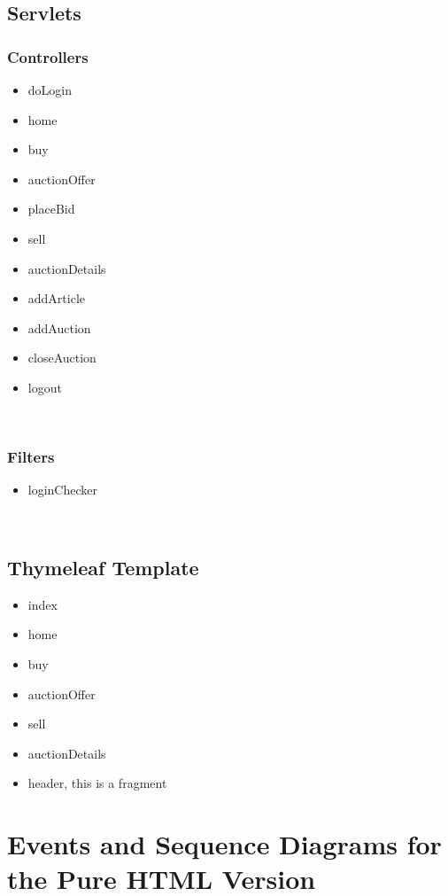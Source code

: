 \documentclass[12pt, a4paper, renqo, final]{amsart}
\let\stdsection\section
\renewcommand{\section}{\newpage\stdsection}
\begin{document}
		\subsection{Servlets}
			\subsubsection{Controllers}
				\begin{itemize}
					\item doLogin
					\item home
					\item buy
					\item auctionOffer
					\item placeBid
					\item sell
					\item auctionDetails
					\item addArticle
					\item addAuction
					\item closeAuction
					\item logout
				\end{itemize}
				\phantom{.}\\
			\subsubsection{Filters}
				\begin{itemize}
					\item loginChecker
				\end{itemize}
				\phantom{.}\\
			\subsection{Thymeleaf Template}
				\begin{itemize}
					\item index
					\item home
					\item buy
					\item auctionOffer
					\item sell
					\item auctionDetails
					\item header, this is a fragment
				\end{itemize}
		\section[PureHTML - Events and Sequence Diagrams]{Events and Sequence Diagrams for the Pure HTML Version}
\end{document}
